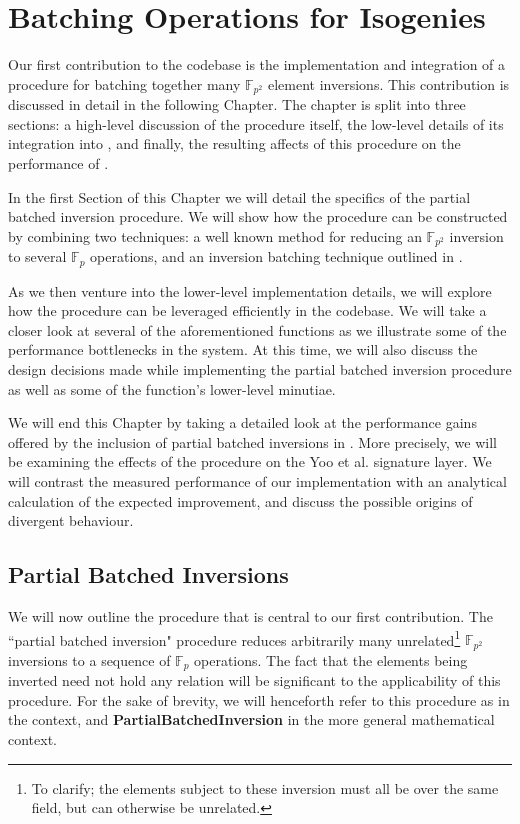 \chapter{Batching Operations for Isogenies}
\label{sec:batching}

Our first contribution to the \sidh codebase is the implementation and integration of a procedure for batching together many $\mathbb{F}_{p^2}$ element inversions. This contribution is discussed in detail in the following Chapter. The chapter is split into three sections: a high-level discussion of the procedure itself, the low-level details of its integration into \sidh, and finally, the resulting affects of this procedure on the performance of \sidh.

In the first Section of this Chapter we will detail the specifics of the partial batched inversion procedure. We will show how the procedure can be constructed by combining two techniques: a well known method for reducing an $\mathbb{F}_{p^2}$ inversion to several $\mathbb{F}_{p}$ operations, and an inversion batching technique outlined in \cite{batching}.

As we then venture into the lower-level implementation details, we will explore how the procedure can be leveraged efficiently in the codebase. We will take a closer look at several of the aforementioned \sidh functions as we illustrate some of the performance bottlenecks in the system. At this time, we will also discuss the design decisions made while implementing the partial batched inversion procedure as well as some of the function's lower-level minutiae.

We will end this Chapter by taking a detailed look at the performance gains offered by the inclusion of partial batched inversions in \sidh. More precisely, we will be examining the effects of the procedure on the Yoo et al. signature layer. We will contrast the measured performance of our implementation with an analytical calculation of the expected improvement, and discuss the possible origins of divergent behaviour.\\

\section{Partial Batched Inversions}
\label{sec:pbi}

We will now outline the procedure that is central to our first contribution. The ``partial batched inversion" procedure reduces arbitrarily many unrelated\footnote{To clarify; the elements subject to these inversion must all be over the same field, but can otherwise be unrelated.} $\mathbb{F}_{p^{2}}$ inversions to a sequence of $\mathbb{F}_{p}$ operations. The fact that the elements being inverted need not hold any relation will be significant to the applicability of this procedure. For the sake of brevity, we will henceforth refer to this procedure as  in the \sidh context, and \textbf{PartialBatchedInversion} in the more general mathematical context.

